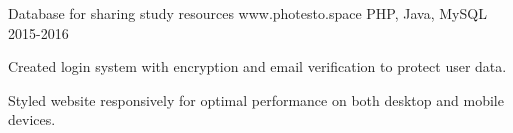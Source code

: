 \begin{cventries}
\cventry
    {Database for sharing study resources}
    {www.photesto.space}
    {PHP, Java, MySQL}
    {2015-2016}
    {
      \begin{cvitems}
      	\item Created login system with encryption and email verification to protect user data.
      	\item Styled website responsively for optimal performance on both desktop and mobile devices.
      \end{cvitems}
    }

\end{cventries}
